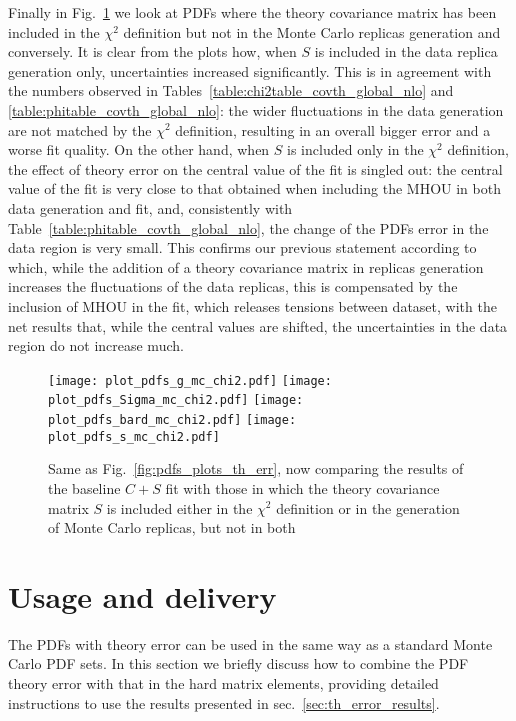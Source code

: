     Finally in Fig.~\ref{fig:pdfs_plots_th_err_mc_chi2} we look at PDFs where the theory covariance matrix has been
    included in the $\chi^2$ definition but not in the Monte Carlo replicas generation and conversely.
    It is clear from the plots how, when $S$ is included in the data replica generation only, 
    uncertainties increased significantly. This is in agreement with the numbers observed in 
    Tables~\ref{table:chi2table_covth_global_nlo} and \ref{table:phitable_covth_global_nlo}: the wider fluctuations 
    in the data generation are not matched by the $\chi^2$ definition, resulting in an overall bigger error and a worse
    fit quality.
    On the other hand, when $S$ is included only in the $\chi^2$ definition, the effect of theory error on
    the central value of the fit is singled out: the central value of the fit is very close to that obtained 
    when including the MHOU in both data generation and fit, and, consistently with Table~\ref{table:phitable_covth_global_nlo},
    the change of the PDFs error in the data region is very small.
    This confirms our previous statement according to which, while the addition of a theory covariance matrix
    in replicas generation increases the fluctuations of the data replicas, this is compensated by the inclusion of MHOU
    in the fit, which releases tensions between dataset, with the net results that, while the central values are shifted, 
    the uncertainties in the data region do not increase much.
    \begin{figure}[t!]
        \begin{center}
            \texttt{[image: plot\_pdfs\_g\_mc\_chi2.pdf]}
            \texttt{[image: plot\_pdfs\_Sigma\_mc\_chi2.pdf]}
            \texttt{[image: plot\_pdfs\_bard\_mc\_chi2.pdf]}
            \texttt{[image: plot\_pdfs\_s\_mc\_chi2.pdf]}
            \caption{Same as Fig.~\ref{fig:pdfs_plots_th_err}, now comparing the results of the baseline $C + S$
            fit with those in which the theory covariance matrix $S$ is included
            either in the $\chi^2$ definition or in the generation of Monte Carlo replicas, but not in both} 
            \label{fig:pdfs_plots_th_err_mc_chi2} 
        \end{center}
    \end{figure}

    \section{Usage and delivery}
    \label{sec:th_error_usage}
    The PDFs with theory error can be used in the same way as a standard Monte Carlo PDF sets.
    In this section we briefly discuss how to combine the PDF theory error with that in the hard matrix elements,
    providing detailed instructions to use the results presented in sec.~\ref{sec:th_error_results}. 

